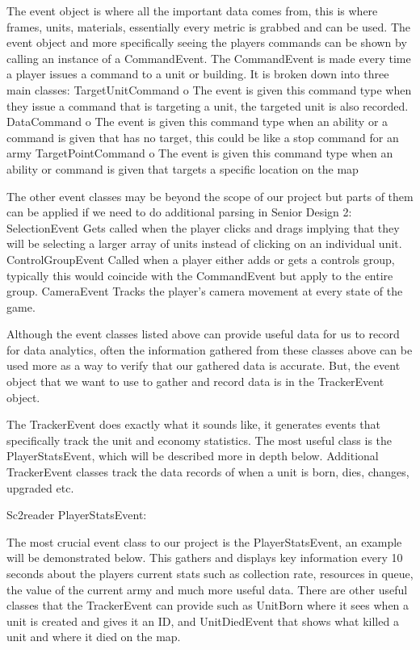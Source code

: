\documentclass[a4paper,12pt]{report}
\begin{document}
The event object is where all the important data comes from, this is where frames, units, materials, essentially every metric is grabbed and can be used. The event object and more specifically seeing the players commands can be shown by calling an instance of a CommandEvent. The CommandEvent is made every time a player issues a command to a unit or building. It is broken down into three main classes:
TargetUnitCommand
o   The event is given this command type when they issue a command that is targeting a unit, the targeted unit is also recorded.
  DataCommand
o   The event is given this command type when an ability or a command is given that has no target, this could be like a stop command for an army
 TargetPointCommand
o   The event is given this command type when an ability or command is given that targets a specific location on the map

The other event classes may be beyond the scope of our project but parts of them can be applied if we need to do additional parsing in Senior Design 2:
SelectionEvent
Gets called when the player clicks and drags implying that they will be selecting a larger array of units instead of clicking on an individual unit. 
ControlGroupEvent
Called when a player either adds or gets a controls group, typically this would coincide with the CommandEvent but apply to the entire group.
CameraEvent
Tracks the player's camera movement at every state of the game. 

Although the event classes listed above can provide useful data for us to record for data analytics, often the information gathered from these classes above can be used more as a way to verify that our gathered data is accurate. But, the event object that we want to use to gather and record data is in the TrackerEvent object.

The TrackerEvent does exactly what it sounds like, it generates events that specifically track the unit and economy statistics. The most useful class is the PlayerStatsEvent, which will be described more in depth below. Additional TrackerEvent classes track the data records of when a unit is born, dies, changes, upgraded etc.


Sc2reader PlayerStatsEvent:

The most crucial event class to our project is the PlayerStatsEvent, an example will be demonstrated below. This gathers and displays key information every 10 seconds about the players current stats such as collection rate, resources in queue, the value of the current army and much more useful data. There are other useful classes that the TrackerEvent can provide such as UnitBorn where it sees when a unit is created and gives it an ID, and UnitDiedEvent that shows what killed a unit and where it died on the map.
\end{document}
